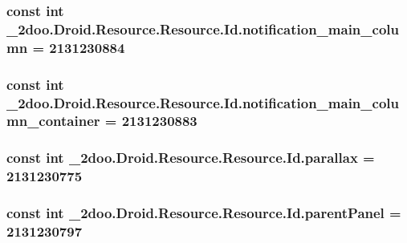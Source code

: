 \hypertarget{class__2doo_1_1_droid_1_1_resource_1_1_id_f5e412f7e23409292f0f6eb1c59a197f}{
\subsubsection[{notification\_\-main\_\-column}]{\setlength{\rightskip}{0pt plus 5cm}const int \_\-2doo.Droid.Resource.Resource.Id.notification\_\-main\_\-column = 2131230884}}
\label{class__2doo_1_1_droid_1_1_resource_1_1_id_f5e412f7e23409292f0f6eb1c59a197f}


\hypertarget{class__2doo_1_1_droid_1_1_resource_1_1_id_3669e89c783cf40dc6e69cddd89fe415}{
\subsubsection[{notification\_\-main\_\-column\_\-container}]{\setlength{\rightskip}{0pt plus 5cm}const int \_\-2doo.Droid.Resource.Resource.Id.notification\_\-main\_\-column\_\-container = 2131230883}}
\label{class__2doo_1_1_droid_1_1_resource_1_1_id_3669e89c783cf40dc6e69cddd89fe415}


\hypertarget{class__2doo_1_1_droid_1_1_resource_1_1_id_65c593b161a0a4b8405ba1684fff903a}{
\subsubsection[{parallax}]{\setlength{\rightskip}{0pt plus 5cm}const int \_\-2doo.Droid.Resource.Resource.Id.parallax = 2131230775}}
\label{class__2doo_1_1_droid_1_1_resource_1_1_id_65c593b161a0a4b8405ba1684fff903a}


\hypertarget{class__2doo_1_1_droid_1_1_resource_1_1_id_b04a5ec06293573c38508cd49f9ef7a3}{
\subsubsection[{parentPanel}]{\setlength{\rightskip}{0pt plus 5cm}const int \_\-2doo.Droid.Resource.Resource.Id.parentPanel = 2131230797}}
\label{class__2doo_1_1_droid_1_1_resource_1_1_id_b04a5ec06293573c38508cd49f9ef7a3}


